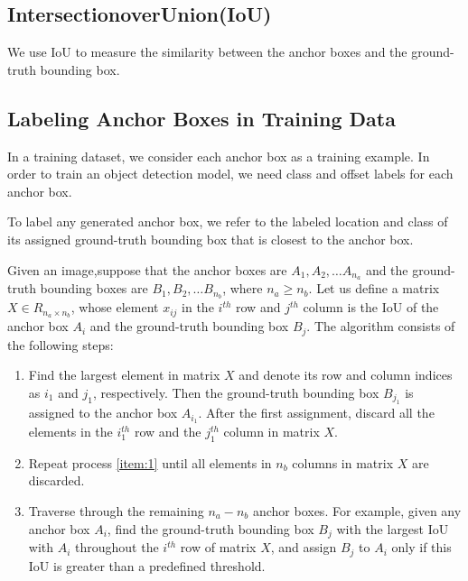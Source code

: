 \subsection{IntersectionoverUnion(IoU)}
\label{sec:iou}

We use IoU to measure the similarity between the anchor boxes and the ground-truth bounding box.


\subsection{Labeling Anchor Boxes in Training Data}
\label{sec:label-anch-boxes}

In a training dataset, we consider each anchor box as a training example.
In order to train an object detection model, we need class and offset labels for each anchor box.


To label any generated anchor box, we refer to the labeled location and class of its assigned ground-truth bounding box that is closest to the anchor box.

Given an image,suppose that the anchor boxes are \(A_{1}, A_{2}, \ldots A_{n_{a}}\) and the ground-truth bounding boxes are \(B_{1},B_{2},\ldots B_{n_{b}}\), where \(n_{a} \ge n_{b}\).
Let us define a matrix \(X \in R_{n_{a}\times n_{b}}\), whose element \(x_{ij}\) in the \(i^{th}\) row and \(j^{th}\) column is the IoU of the anchor box \(A_{i}\) and the ground-truth bounding box \(B_{j}\).
The algorithm consists of the following steps:

\begin{enumerate}
\item \label{item:1}Find the largest element in matrix \(X\) and denote its row and column indices as \(i_{1}\) and \(j_{1}\), respectively. Then the ground-truth bounding box \(B_{j_{1}}\) is assigned to the anchor box \(A_{i_{1}}\). After the first assignment, discard all the elements in the \(i_{1}^{th}\) row and the \(j_{1}^{th}\) column in matrix \(X\).
\item Repeat process \ref{item:1} until all elements in \(n_{b}\) columns in matrix \(X\) are discarded. 
\item Traverse through the remaining \(n_{a} - n_{b}\) anchor boxes. For example, given any anchor box \(A_{i}\), find the ground-truth bounding box \(B_{j}\) with the largest IoU with \(A_{i}\) throughout the \(i^{th}\) row of matrix \(X\), and assign \(B_{j}\) to \(A_{i}\) only if this IoU is greater than a predefined threshold.
\end{enumerate}

